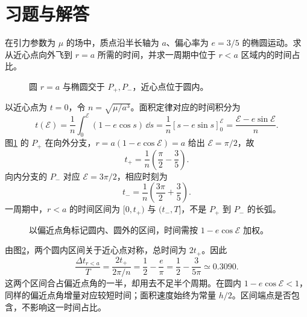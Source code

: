 \section{习题与解答}

\begin{exercise}[在半长轴以内停留多久]\label{sup8:problem-exercise-2}\label{sup8:ex:d8-h2}
在引力参数为 $\mu$ 的场中，质点沿半长轴为 $a$、偏心率为 $e=3/5$ 的椭圆运动。求从近心点向外飞到 $r=a$ 所需的时间，并求一周期中位于 $r<a$ 区域内的时间占比。
\end{exercise}
\begin{figure}[H]\centering
{}
\caption{圆 $r=a$ 与椭圆交于 $P_+,P_-$，近心点位于圆内。}\label{sup8:fig:d8-h2-q}
\end{figure}
\begin{solution}
以近心点为 $t=0$，令 $n=\sqrt{\mu/a^3}$。面积定律对应的时间积分为
\[
t(\mathcal E)=\frac1n\int_0^{\mathcal E}(1-e\cos s)\,\dd s
=\frac1n[s-e\sin s]_0^{\mathcal E}
=\frac{\mathcal E-e\sin\mathcal E}{n}.
\]
图\ref{sup8:fig:d8-h2-q} 的 $P_+$ 在向外分支，$r=a(1-e\cos\mathcal E)=a$ 给出 $\mathcal E=\pi/2$，故
\[
 t_+=\frac1n\left(\frac\pi2-\frac35\right).
\]
向内分支的 $P_-$ 对应 $\mathcal E=3\pi/2$，相应时刻为
\[
 t_-=\frac1n\left(\frac{3\pi}2+\frac35\right).
\]
一周期中，$r<a$ 的时间区间为 $[0,t_+)$ 与 $(t_-,T]$，不是 $P_+$ 到 $P_-$ 的长弧。
\begin{figure}[H]\centering
{}
\caption{以偏近点角标记圆内、圆外的区间，时间需按 $1-e\cos\mathcal E$ 加权。}\label{sup8:fig:d8-h2-s}
\end{figure}
由图\ref{sup8:fig:d8-h2-s}，两个圆内区间关于近心点对称，总时间为 $2t_+$。因此
\[
 \boxed{\frac{\Delta t_{r<a}}T=\frac{2t_+}{2\pi/n}
 =\frac12-\frac e\pi=\frac12-\frac3{5\pi}\simeq0.3090}.
\]
这两个区间合占偏近点角的一半，却用去不足半个周期。在圆内 $1-e\cos\mathcal E<1$，同样的偏近点角增量对应较短时间；面积速度始终为常量 $h/2$。区间端点是否包含，不影响这一时间占比。
\end{solution}


